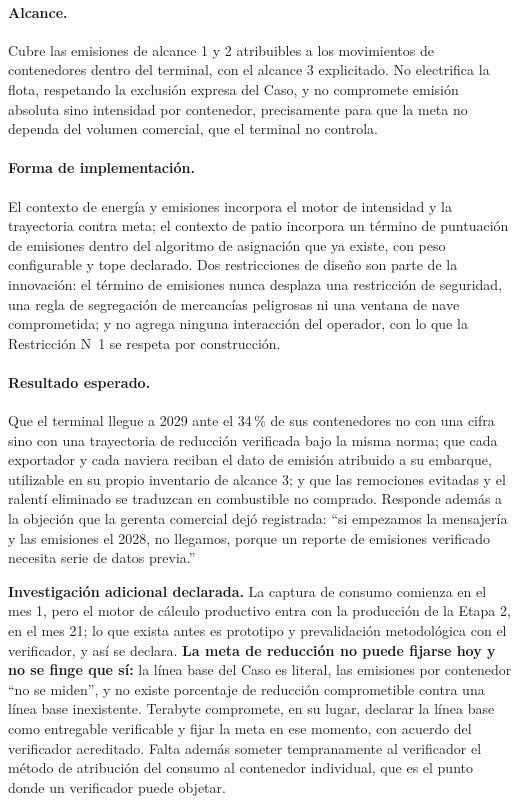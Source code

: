 \paragraph*{Alcance.}
Cubre las emisiones de alcance 1 y 2 atribuibles a los movimientos de
contenedores dentro del terminal, con el alcance 3 explicitado. No electrifica
la flota, respetando la exclusión expresa del Caso, y no compromete emisión
absoluta sino intensidad por contenedor, precisamente para que la meta no
dependa del volumen comercial, que el terminal no controla.

\paragraph*{Forma de implementación.}
El contexto de energía y emisiones incorpora el motor de intensidad y la
trayectoria contra meta; el contexto de patio incorpora un término de
puntuación de emisiones dentro del algoritmo de asignación que ya existe, con
peso configurable y tope declarado. Dos restricciones de diseño son parte de la
innovación: el término de emisiones nunca desplaza una restricción de
seguridad, una regla de segregación de mercancías peligrosas ni una ventana de
nave comprometida; y no agrega ninguna interacción del operador, con lo que la
Restricción N\textdegree{}~1 se respeta por construcción.

\paragraph*{Resultado esperado.}
Que el terminal llegue a 2029 ante el 34\,\% de sus contenedores no con una
cifra sino con una trayectoria de reducción verificada bajo la misma norma; que
cada exportador y cada naviera reciban el dato de emisión atribuido a su
embarque, utilizable en su propio inventario de alcance 3; y que las remociones
evitadas y el ralentí eliminado se traduzcan en combustible no comprado.
Responde además a la objeción que la gerenta comercial dejó registrada:
\enquote{si empezamos la mensajería y las emisiones el 2028, no llegamos,
porque un reporte de emisiones verificado necesita serie de datos previa.}

\begin{bloqueDuda}
\textbf{Investigación adicional declarada.} La captura de consumo comienza en
el mes 1, pero el motor de cálculo productivo entra con la producción de la
Etapa 2, en el mes 21; lo que exista antes es prototipo y prevalidación
metodológica con el verificador, y así se declara. \textbf{La meta de reducción
no puede fijarse hoy y no se finge que sí:} la línea base del Caso es literal,
las emisiones por contenedor \enquote{no se miden}, y no existe porcentaje de
reducción comprometible contra una línea base inexistente. Terabyte compromete,
en su lugar, declarar la línea base como entregable verificable y fijar la meta
en ese momento, con acuerdo del verificador acreditado. Falta además someter
tempranamente al verificador el método de atribución del consumo al contenedor
individual, que es el punto donde un verificador puede objetar.
\end{bloqueDuda}

